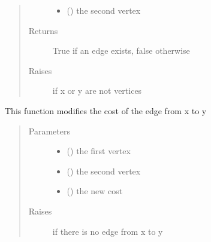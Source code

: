 \documentclass[letterpaper,10pt,english]{sphinxmanual}
\begin{document}
\begin{fulllineitems}
\begin{fulllineitems}
\begin{quote}
\begin{description}
\begin{itemize}
\item {} 
 () \textendash{} the second vertex

\end{itemize}

\item[{Returns}] \leavevmode
True if an edge exists, false otherwise

\item[{Raises}] \leavevmode
{} \textendash{} if x or y are not vertices

\end{description}\end{quote}

\end{fulllineitems}


\begin{fulllineitems}
\label{\detokenize{UndirectedGraph:UndirectedGraph.UndirectedGraph.modify_edge_cost}}
This function modifies the cost of the edge from x to y
\begin{quote}\begin{description}
\item[{Parameters}] \leavevmode\begin{itemize}
\item {} 
 () \textendash{} the first vertex

\item {} 
 () \textendash{} the second vertex

\item {} 
 () \textendash{} the new cost

\end{itemize}

\item[{Raises}] \leavevmode
{} \textendash{} if there is no edge from x to y


\end{description}
\end{quote}
\end{fulllineitems}
\end{fulllineitems}
\end{document}

